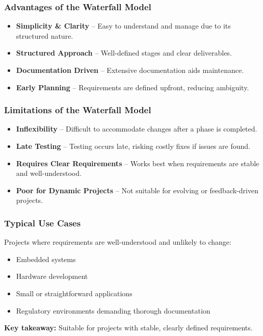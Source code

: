 \documentclass{beamer}
\begin{document}
\begin{frame}[fragile]
    \frametitle{Advantages of the Waterfall Model}
    \begin{itemize}
        \item \textbf{Simplicity \& Clarity} -- Easy to understand and manage due to its structured nature.
        \item \textbf{Structured Approach} -- Well-defined stages and clear deliverables.
        \item \textbf{Documentation Driven} -- Extensive documentation aids maintenance.
        \item \textbf{Early Planning} -- Requirements are defined upfront, reducing ambiguity.
    \end{itemize}
\end{frame}

\begin{frame}[fragile]
    \frametitle{Limitations of the Waterfall Model}
    \begin{itemize}
        \item \textbf{Inflexibility} -- Difficult to accommodate changes after a phase is completed.
        \item \textbf{Late Testing} -- Testing occurs late, risking costly fixes if issues are found.
        \item \textbf{Requires Clear Requirements} -- Works best when requirements are stable and well-understood.
        \item \textbf{Poor for Dynamic Projects} -- Not suitable for evolving or feedback-driven projects.
    \end{itemize}
\end{frame}

\begin{frame}[fragile]
    \frametitle{Typical Use Cases}
    Projects where requirements are well-understood and unlikely to change:
    \begin{itemize}
        \item Embedded systems
        \item Hardware development
        \item Small or straightforward applications
        \item Regulatory environments demanding thorough documentation
    \end{itemize}
    \vspace{0.5cm}
    \textbf{Key takeaway:} Suitable for projects with stable, clearly defined requirements.
\end{frame}
\end{document}
